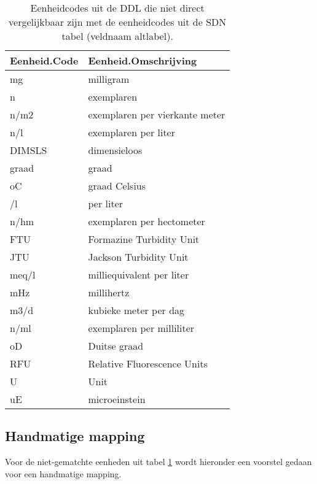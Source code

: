 \documentclass[
]{book}
\begin{document}
\begin{table}

\caption{\label{tab:DDL-SDN-antijoin}Eenheidcodes uit de DDL die niet direct vergelijkbaar zijn met de eenheidcodes uit de SDN tabel (veldnaam altlabel).}
\centering
\begin{tabular}[t]{l|l}
\hline
Eenheid.Code & Eenheid.Omschrijving\\
\hline
mg & milligram\\
\hline
n & exemplaren\\
\hline
n/m2 & exemplaren per vierkante meter\\
\hline
n/l & exemplaren per liter\\
\hline
DIMSLS & dimensieloos\\
\hline
graad & graad\\
\hline
oC & graad Celsius\\
\hline
/l & per liter\\
\hline
n/hm & exemplaren per hectometer\\
\hline
FTU & Formazine Turbidity Unit\\
\hline
JTU & Jackson Turbidity Unit\\
\hline
meq/l & milliequivalent per liter\\
\hline
mHz & millihertz\\
\hline
m3/d & kubieke meter per dag\\
\hline
n/ml & exemplaren per milliliter\\
\hline
oD & Duitse graad\\
\hline
RFU & Relative Fluorescence Units\\
\hline
U & Unit\\
\hline
uE & microeinstein\\
\hline
\end{tabular}
\end{table}

\hypertarget{handmatige-mapping}{%
\subsection{Handmatige mapping}\label{handmatige-mapping}}

Voor de niet-gematchte eenheden uit tabel \ref{tab:DDL-SDN-antijoin} wordt hieronder een voorstel gedaan voor een handmatige mapping.
\end{document}
